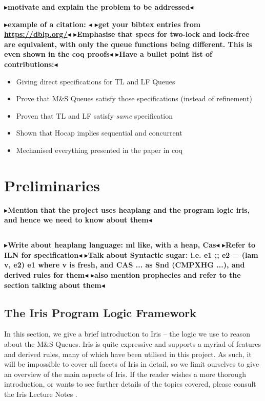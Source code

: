 \documentclass[a4paper, 10pt]{report}
\theoremstyle{definition}
\newcommand{\msq}{M\&S Queue}
\newcommand{\todo}[1]{{\color[rgb]{.5,0,0}\textbf{$\blacktriangleright$#1$\blacktriangleleft$}}}
\begin{document}
\todo{motivate and explain the problem to be addressed}

\todo{example of a citation: \cite{DBLP:conf/podc/MichaelS96}}
\todo{get your bibtex entries from \url{https://dblp.org/}}
\todo{Emphasise that specs for two-lock and lock-free are equivalent, with only the queue functions being different. This is even shown in the coq proofs}
\todo{Have a bullet point list of contributions:}
\begin{itemize}
  \item Giving direct specifications for TL and LF Queues
  \item Prove that \msq{}s satisfy those specifications (instead of refinement)
  \item Proven that TL and LF satisfy \emph{same} specification
  \item Shown that Hocap implies sequential and concurrent
  \item Mechanised everything presented in the paper in coq
\end{itemize}




\chapter{Preliminaries}
\label{ch:preliminaries}

\todo{Mention that the project uses heaplang and the program logic iris, and hence we need to know about them}


\section{\heaplang}
\label{Pre:section:heaplang}

\todo{Write about heaplang language: ml like, with a heap, Cas}
\todo{Refer to ILN for specification}
\todo{Talk about Syntactic sugar: i.e. e1 ;; e2 = (lam v, e2) e1 where v is fresh, and CAS ... as Snd (CMPXHG ...), and derived rules for them}
\todo{also mention prophecies and refer to the section talking about them}


\section{The Iris Program Logic Framework}
\label{Pre:section:iris}
In this section, we give a brief introduction to Iris -- the logic we use to reason about the \msq{}s. Iris is quite expressive and supports a myriad of features and derived rules, many of which have been utilised in this project. As such, it will be impossible to cover all facets of Iris in detail, so we limit ourselves to give an overview of the main aspects of Iris. If the reader wishes a more thorough introduction, or wants to see further details of the topics covered, please consult the Iris Lecture Notes \citep{gentleiris}.
\end{document}
